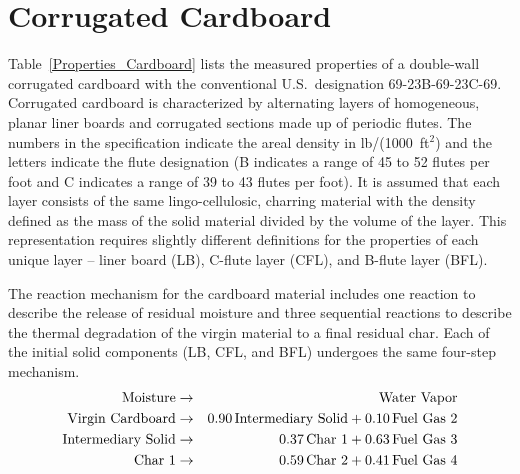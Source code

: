 \clearpage

\section{Corrugated Cardboard}
\label{Cardboard}

Table~\ref{Properties_Cardboard} lists the measured properties of a double-wall corrugated cardboard with the conventional U.S.~designation 69-23B-69-23C-69. Corrugated cardboard is characterized by alternating layers of homogeneous, planar liner boards and corrugated sections made up of periodic flutes. The numbers in the specification indicate the areal density in lb/(1000~ft$^2$) and the letters indicate the flute designation (B indicates a range of 45 to 52 flutes per foot and C indicates a range of 39 to 43 flutes per foot). It is assumed that each layer consists of the same lingo-cellulosic, charring material with the density defined as the mass of the solid material divided by the volume of the layer. This representation requires slightly different definitions for the properties of each unique layer -- liner board (LB), C-flute layer (CFL), and B-flute layer (BFL).

The reaction mechanism for the cardboard material includes one reaction to describe the release of residual moisture and three sequential reactions to describe the thermal degradation of the virgin material to a final residual char. Each of the initial solid components (LB, CFL, and BFL) undergoes the same four-step mechanism.
\begin{eqnarray}
   \hbox{Moisture}            &\to& \hbox{Water Vapor}  \\
   \hbox{Virgin Cardboard}    &\to& 0.90 \, \hbox{Intermediary Solid} + 0.10 \, \hbox{Fuel Gas 2}  \\
   \hbox{Intermediary Solid}  &\to& 0.37 \, \hbox{Char 1}             + 0.63 \, \hbox{Fuel Gas 3}  \\
   \hbox{Char 1}              &\to& 0.59 \, \hbox{Char 2}             + 0.41 \, \hbox{Fuel Gas 4}
\end{eqnarray}

